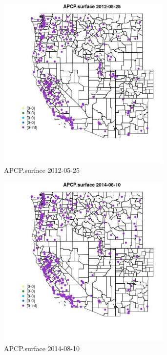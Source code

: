 \begin{figure} 
\centering  
\includegraphics[width=0.77\textwidth]{Code_Outputs/Report_ML_input_PM25_Step4_part_e_de_duplicated_aves_compiled_2019-05-18wNAs_MapObsAPCPsurface2012-05-25.jpg} 
\caption{\label{fig:Report_ML_input_PM25_Step4_part_e_de_duplicated_aves_compiled_2019-05-18wNAsMapObsAPCPsurface2012-05-25}APCP.surface 2012-05-25} 
\end{figure} 
 

\clearpage 

\begin{figure} 
\centering  
\includegraphics[width=0.77\textwidth]{Code_Outputs/Report_ML_input_PM25_Step4_part_e_de_duplicated_aves_compiled_2019-05-18wNAs_MapObsAPCPsurface2014-08-10.jpg} 
\caption{\label{fig:Report_ML_input_PM25_Step4_part_e_de_duplicated_aves_compiled_2019-05-18wNAsMapObsAPCPsurface2014-08-10}APCP.surface 2014-08-10} 
\end{figure} 
 

